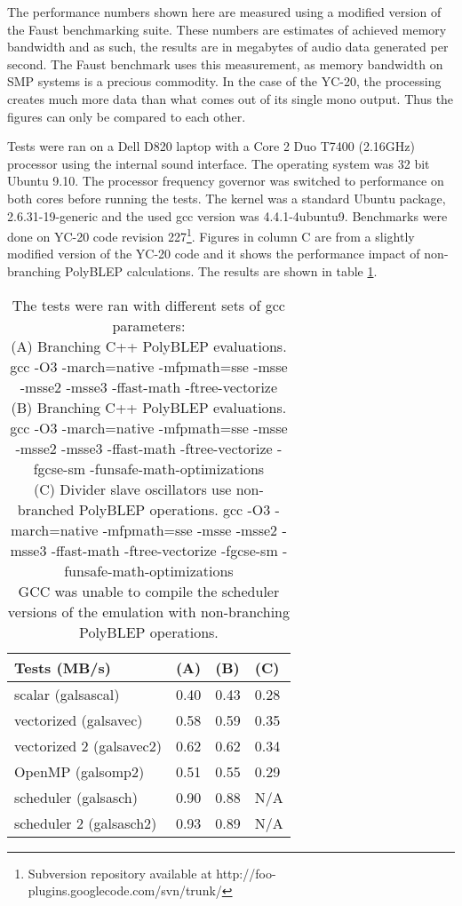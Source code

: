 \documentclass[11pt,a4paper]{article}
\begin{document}
The performance numbers shown here are measured using a modified version of the Faust benchmarking suite. These numbers are estimates of achieved memory bandwidth and as such, the results are in megabytes of audio data generated per second. The Faust benchmark uses this measurement, as memory bandwidth on SMP systems is a precious commodity. In the case of the YC-20, the processing creates much more data than what comes out of its single mono output. Thus the figures can only be compared to each other.

Tests were ran on a Dell D820 laptop with a Core 2 Duo T7400 (2.16GHz) processor using the internal sound interface. The operating system was 32 bit Ubuntu 9.10. The processor frequency governor was switched to performance on both cores before running the tests. The kernel was a standard Ubuntu package, 2.6.31-19-generic and the used gcc version was 4.4.1-4ubuntu9. Benchmarks were done on YC-20 code revision 227\footnote{Subversion repository available at http://foo-plugins.googlecode.com/svn/trunk/}. Figures in column C are from a slightly modified version of the YC-20 code and it shows the performance impact of non-branching PolyBLEP calculations. The results are shown in table \ref{table:performance}.

\begin{table}[h]
 \begin{center}
\begin{tabular}{|l|l|l|l|}

      \hline
      Tests (MB/s)             & (A)  & (B)  & (C) \\
      \hline\hline
      scalar (galsascal)       & 0.40 & 0.43 & 0.28 \\
      vectorized (galsavec)    & 0.58 & 0.59 & 0.35 \\
      vectorized 2 (galsavec2) & 0.62 & 0.62 & 0.34 \\
      OpenMP (galsomp2)        & 0.51 & 0.55 & 0.29 \\
      scheduler (galsasch)     & 0.90 & 0.88 & N/A \\
      scheduler 2 (galsasch2)  & 0.93 & 0.89 & N/A \\
      \hline

\end{tabular}
\caption{The tests were ran with different sets of gcc parameters: \\
(A) Branching C++ PolyBLEP evaluations. gcc -O3 -march=native -mfpmath=sse -msse -msse2 -msse3 -ffast-math -ftree-vectorize \\
(B) Branching C++ PolyBLEP evaluations. gcc -O3 -march=native -mfpmath=sse -msse -msse2 -msse3 -ffast-math -ftree-vectorize -fgcse-sm  -funsafe-math-optimizations \\
(C) Divider slave oscillators use non-branched PolyBLEP operations. gcc -O3 -march=native -mfpmath=sse -msse -msse2 -msse3 -ffast-math -ftree-vectorize -fgcse-sm  -funsafe-math-optimizations \\
GCC was unable to compile the scheduler versions of the emulation with non-branching PolyBLEP operations.\\
}\label{table:performance}
 \end{center}
\end{table}
\end{document}
